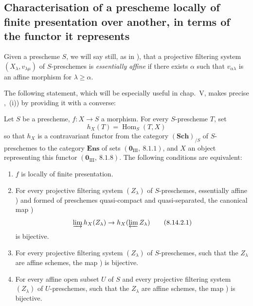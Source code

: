\subsection{Characterisation of a prescheme locally of finite presentation over another, in terms of the functor it represents}
\label{subsection:IV.8.14}

\begin{env}[8.14.1]
\label{IV.8.14.1}
Given a prescheme $S$, we will say still, as in ), that a projective filtering system $(X_\lambda,v_{\lambda\mu})$ of $S$-preschemes is \emph{essentially affine} if there exists $\alpha$ such that $v_{\alpha\lambda}$ is an affine morphism for $\lambda\geqslant\alpha$.

The following statement, which will be especially useful in chap.~V, makes precise ,~(i)) by providing it with a converse:
\end{env}

\begin{proposition}[8.14.2]
\label{IV.8.14.2}
Let $S$ be a prescheme, $f:X\to S$ a morphism.
For every $S$-prescheme $T$, set
\[
h_X(T)=\operatorname{Hom}_S(T,X)
\]
so that $h_X$ is a contravariant functor from the category $(\mathbf{Sch})_{/S}$ of $S$-preschemes to the category $\mathbf{Ens}$ of sets $(\mathbf{0}_{\text{III}},~8.1.1)$, and $X$ an object representing this functor $(\mathbf{0}_{\text{III}},~8.1.8)$.
The following conditions are equivalent:
\begin{enumerate}[label=\emph{\alph*)}]
  \item $f$ is locally of finite presentation.
  \item For every projective filtering system $(Z_\lambda)$ of $S$-preschemes, essentially affine ) and formed of preschemes quasi-compact and quasi-separated, the canonical map )
\begin{equation}
\label{IV.8.14.2.1}
\varinjlim h_X(Z_\lambda)\to h_X(\varprojlim Z_\lambda) \tag{8.14.2.1}
\end{equation}
is bijective.
  \item For every projective filtering system $(Z_\lambda)$ of $S$-preschemes, such that the $Z_\lambda$ are affine schemes, the map ) is bijective.
  \item[\rm c$'$)] For every affine open subset $U$ of $S$ and every projective filtering system $(Z_\lambda)$ of $U$-preschemes, such that the $Z_\lambda$ are affine schemes, the map ) is bijective.
\end{enumerate}
\end{proposition}

